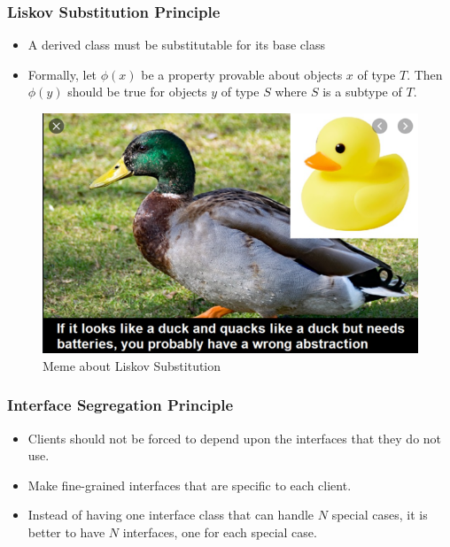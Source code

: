\documentclass{article}
\begin{document}
\subsubsection{Liskov Substitution Principle}
\begin{itemize}
    \item A derived class must be substitutable for its base class
    
    \item Formally, let  $\phi (x)$ be a property provable about objects $x$ of type $T$. Then $\phi(y)$ should be true for objects $y$ of type $S$ where $S$ is a subtype of $T$.
\end{itemize}
\begin{figure}[!h]
    \centering
    \includegraphics[scale=0.4]{meme.png}
    \caption{Meme about Liskov Substitution}
    \label{fig:my_label}
\end{figure}

\subsubsection{Interface Segregation Principle}
\begin{itemize}
    \item Clients should not be forced to depend upon the interfaces that they do not use.
    
    \item Make fine-grained interfaces that are specific to each client. 
    
    \item Instead of having one interface class that can handle $N$ special cases, it is better to have $N$ interfaces, one for each special case.
\end{itemize}
\end{document}
